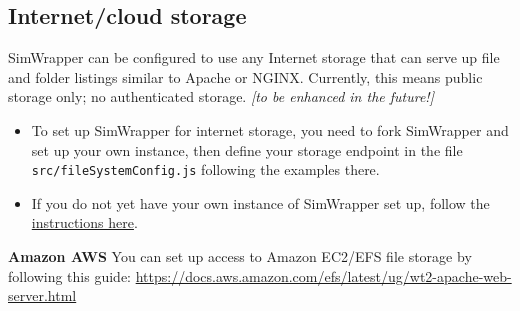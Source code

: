 \hypertarget{internetcloud-storage}{%
\subsection{Internet/cloud storage}\label{internetcloud-storage}}

SimWrapper can be configured to use any Internet storage that can serve
up file and folder listings similar to Apache or NGINX. Currently, this
means public storage only; no authenticated storage. \emph{{[}to be
enhanced in the future!{]}}

\begin{itemize}
\item
  To set up SimWrapper for internet storage, you need to fork SimWrapper
  and set up your own instance, then define your storage endpoint in the
  file \texttt{src/fileSystemConfig.js} following the examples there.
\item
  If you do not yet have your own instance of SimWrapper set up, follow
  the \href{dev-developing-simwrapper.md}{instructions here}.
\end{itemize}

\textbf{Amazon AWS} You can set up access to Amazon EC2/EFS file storage
by following this guide:
\url{https://docs.aws.amazon.com/efs/latest/ug/wt2-apache-web-server.html}

